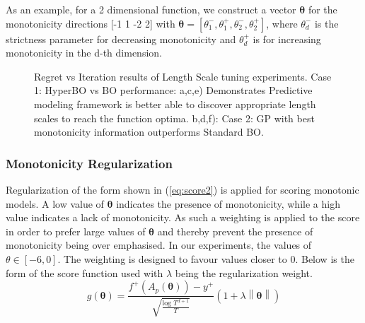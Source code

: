 As an example, for a 2 dimensional function, we construct a vector $\boldsymbol{\theta}$ for the monotonicity directions [-1 1 -2 2] with $\boldsymbol{\theta} = [\theta_{1}^{-}, \theta_{1}^{+}, \theta_{2}^{-}, \theta_{2}^{+}]$, where $\theta_{d}^{-}$ is the strictness parameter for decreasing monotonicity and $\theta_{d}^{+}$ is for increasing monotonicity in the d-th dimension. 

\begin{figure}[t]
	\centering
	\qquad
	\qquad
	\qquad
	\qquad
	\qquad
	\caption{Regret vs Iteration results of Length Scale tuning experiments. Case 1: HyperBO vs BO performance: a,c,e) Demonstrates Predictive modeling framework is better able to discover appropriate length scales to reach the function optima.  b,d,f): Case 2: GP with best monotonicity information outperforms Standard BO.}%
	\label{fig:LengthScale_experiments}%
\end{figure}

\subsubsection{Monotonicity Regularization}
Regularization of the form shown in (\ref{eq:score2}) is applied for scoring monotonic models. A low value of $\boldsymbol{\theta}$ indicates the presence of monotonicity, while a high value indicates a lack of monotonicity. As such a weighting is applied to the score in order to prefer large values of $\boldsymbol{\theta}$ and thereby prevent the presence of monotonicity being over emphasised. In our experiments, the values of $\theta \in [-6, 0]$. The weighting is designed to favour values closer to 0. Below is the form of the score function used with $\lambda$ being the regularization weight.
\begin{equation}\label{eq:score2}
g(\boldsymbol{\theta}) = \frac{f^{+}(A_{p}(\boldsymbol{\theta}))-y^{+}}{\sqrt{\frac{\text{log } T^{d+1}}{T}}}\left(1+\lambda\left\|\boldsymbol{\theta}\right\|\right)
\end{equation}